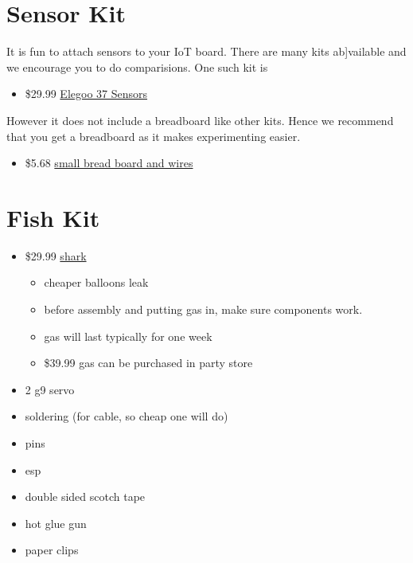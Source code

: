 \section{Sensor Kit}\label{sensor-kit}

It is fun to attach sensors to your IoT board. There are many kits
ab{]}vailable and we encourage you to do comparisions. One such kit is

\begin{itemize}
\tightlist
\item
  \$29.99
  \href{https://www.amazon.com/Elegoo-Upgraded-Modules-Tutorial-Arduino/dp/B01MG49ZQ5/ref=sr_1_7?s=electronics\&ie=UTF8\&qid=1499251441\&sr=1-7\&keywords=elegoo}{Elegoo
  37 Sensors}
\end{itemize}

However it does not include a breadboard like other kits. Hence we
recommend that you get a breadboard as it makes experimenting easier.

\begin{itemize}
\tightlist
\item
  \$5.68
  \href{https://www.amazon.com/Elegoo-Premium-Female-tie-points-breadboard/dp/B06XB8TZVC/ref=sr_1_23?s=electronics\&ie=UTF8\&qid=1499251600\&sr=1-23\&keywords=elegoo}{small
  bread board and wires}
\end{itemize}

\section{Fish Kit}\label{fish-kit}

\begin{itemize}
\tightlist
\item
  \$29.99
  \href{https://www.amazon.com/Swimmer-Inflatable-Flying-Replacement-Balloon/dp/B00658LN3E/ref=pd_bxgy_21_img_2?_encoding=UTF8\&pd_rd_i=B00658LN3E\&pd_rd_r=F71N2YCYE6Z0BCCEPQJC\&pd_rd_w=AwYab\&pd_rd_wg=rHTnv\&psc=1\&refRID=F71N2YCYE6Z0BCCEPQJC}{shark}

  \begin{itemize}
  \tightlist
  \item
    cheaper balloons leak
  \item
    before assembly and putting gas in, make sure components work.
  \item
    gas will last typically for one week
  \item
    \$39.99 gas can be purchased in party store
  \end{itemize}
\item
  2 g9 servo
\item
  soldering (for cable, so cheap one will do)
\item
  pins
\item
  esp
\item
  double sided scotch tape
\item
  hot glue gun
\item
  paper clips
\end{itemize}

